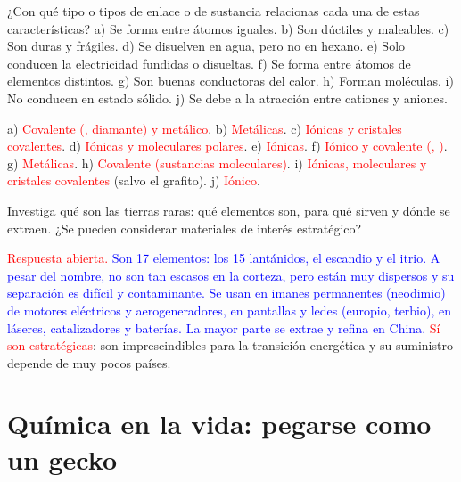 \begin{exercise}
    ¿Con qué tipo o tipos de enlace o de sustancia relacionas cada una de estas características? a) Se forma entre átomos
    iguales. b) Son dúctiles y maleables. c) Son duras y frágiles. d) Se disuelven en agua, pero no en hexano. e) Solo conducen la
    electricidad fundidas o disueltas. f) Se forma entre átomos de elementos distintos. g) Son buenas conductoras del calor.
    h) Forman moléculas. i) No conducen en estado sólido. j) Se debe a la atracción entre cationes y aniones.
    \begin{solu}
        a) \textcolor{red}{Covalente (, diamante) y metálico}. b) \textcolor{red}{Metálicas}. c) \textcolor{red}{Iónicas y
        cristales covalentes}. d) \textcolor{red}{Iónicas y moleculares polares}. e) \textcolor{red}{Iónicas}. f)
        \textcolor{red}{Iónico y covalente (, )}. g) \textcolor{red}{Metálicas}. h) \textcolor{red}{Covalente
        (sustancias moleculares)}. i) \textcolor{red}{Iónicas, moleculares y cristales covalentes} (salvo el grafito).
        j) \textcolor{red}{Iónico}.
    \end{solu}
\end{exercise}

\begin{exercise}
    Investiga qué son las tierras raras: qué elementos son, para qué sirven y dónde se extraen. ¿Se pueden considerar
    materiales de interés estratégico?
    \begin{solu}
        \textcolor{red}{Respuesta abierta.} \textcolor{blue}{Son 17 elementos: los 15 lantánidos, el escandio y el itrio. A pesar
        del nombre, no son tan escasos en la corteza, pero están muy dispersos y su separación es difícil y contaminante. Se usan en
        imanes permanentes (neodimio) de motores eléctricos y aerogeneradores, en pantallas y ledes (europio, terbio), en láseres,
        catalizadores y baterías. La mayor parte se extrae y refina en China.} \textcolor{red}{Sí son estratégicas}: son
        imprescindibles para la transición energética y su suministro depende de muy pocos países.
    \end{solu}
\end{exercise}

\section{Química en la vida: pegarse como un gecko}\label{sec:ud4-gecko}

